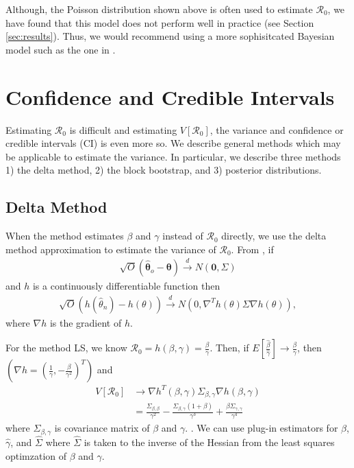\documentclass[12pt]{article}
\newcommand{\rr}{\ensuremath{\mathcal{R}_0}}
\begin{document}
Although, the Poisson distribution shown above is often used to estimate $\rr$, we have found that this model does not perform well in practice (see Section \ref{sec:results}).  Thus, we would recommend using a more sophisitcated Bayesian model such as the one in \cite{bauer2017}.


\section{Confidence and Credible Intervals}
\label{sec:ci}

Estimating $\rr$ is difficult and estimating $V[\rr]$, the variance and confidence or credible intervals (CI) is even more so.  We describe general methods which may be applicable to estimate the variance.  In particular, we describe three methods 1) the delta method, 2) the block bootstrap, and 3) posterior distributions.




\subsection{Delta Method}\label{delta-method}

When the method estimates \(\beta\) and \(\gamma\) instead of \(\rr\) directly, we use the delta method approximation to estimate the
variance of \(\rr\).   From \cite{wasserman2004}, if
\begin{align*}
  \sqrt{O} \left ( \hat{\mathbf{\theta}}_o - \mathbf{\theta} \right ) \overset{d}{\to} N\left ( \mathbf{0}, \Sigma \right  )
\end{align*}
and $h$ is a continuously differentiable function then
\begin{align*}
  \sqrt{O} \left (h(\hat{\theta}_n) - h(\theta) \right ) \overset{d}{\to} N \left (0,  \nabla^T h(\theta)\Sigma \nabla h(\theta)\right ),
\end{align*}
where $\nabla h$ is the gradient of $h$.

For the method LS, we know $\rr = h(\beta, \gamma) = \frac{\beta}{\gamma}$. Then, if $E\left [\frac{\hat{\beta}}{\hat{\gamma}}\right] \to \frac{\beta}{\gamma}$, then  $(\nabla h = (\frac{1}{\gamma},  -\frac{\beta}{\gamma^2})^T)$ and
\begin{align*}
  V[\rr] &\to \nabla h^T(\beta, \gamma) \Sigma_{\beta, \gamma} \nabla h(\beta, \gamma) \\
  &= \frac{\Sigma_{\beta, \beta}}{\gamma^2} - \frac{\Sigma_{\beta, \gamma}(1 + \beta)}{\gamma^3} + \frac{\beta \Sigma_{\gamma, \gamma}}{\gamma^4}
\end{align*}
where $\Sigma_{\beta, \gamma}$ is covariance matrix of \(\beta\) and \(\gamma\). .  We can use plug-in estimators for $\hat{\beta}$, $\hat{\gamma}$, and $\hat{\Sigma}$ where $\hat{\Sigma}$ is taken to the inverse of the Hessian from the least squares optimzation of $\beta$ and $\gamma$.
\end{document}
